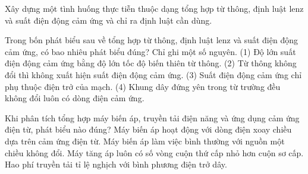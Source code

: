 \begin{bt}
Xây dựng một tình huống thực tiễn thuộc dạng tổng hợp từ thông, định luật lenz và suất điện động cảm ứng và chỉ ra định luật cần dùng.
\end{bt}

\begin{ex}
Trong bốn phát biểu sau về tổng hợp từ thông, định luật lenz và suất điện động cảm ứng, có bao nhiêu phát biểu đúng? Chỉ ghi một số nguyên. (1) Độ lớn suất điện động cảm ứng bằng độ lớn tốc độ biến thiên từ thông. (2) Từ thông không đổi thì không xuất hiện suất điện động cảm ứng. (3) Suất điện động cảm ứng chỉ phụ thuộc điện trở của mạch. (4) Khung dây đứng yên trong từ trường đều không đổi luôn có dòng điện cảm ứng.
\end{ex}

\begin{ex}
Khi phân tích tổng hợp máy biến áp, truyền tải điện năng và ứng dụng cảm ứng điện từ, phát biểu nào đúng?
\choice
{\True Máy biến áp hoạt động với dòng điện xoay chiều dựa trên cảm ứng điện từ.}
{Máy biến áp làm việc bình thường với nguồn một chiều không đổi.}
{Máy tăng áp luôn có số vòng cuộn thứ cấp nhỏ hơn cuộn sơ cấp.}
{Hao phí truyền tải tỉ lệ nghịch với bình phương điện trở dây.}
\end{ex}


